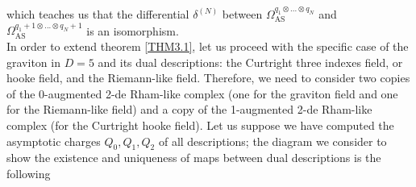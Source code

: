 \documentclass[a4paper,12pt]{article}
\begin{document}
which teaches us that the differential $\delta^{(N)}$ between $\Omega _{\text{AS}}^{q_{1} \otimes ...\otimes q_{N}}$ and $\Omega _{\text{AS}}^{q_{1}+1 \otimes ...\otimes q_{N}+1}$ is an isomorphism. \\
In order to extend theorem \ref{THM3.1}, let us proceed with the specific case of the graviton in $D=5$ and its dual descriptions: the Curtright three indexes field, or hooke field, and the Riemann-like field. Therefore, we need to consider two copies of the 0-augmented 2-de Rham-like complex (one for the graviton field and one for the Riemann-like field) and a copy of the 1-augmented 2-de Rham-like complex (for the Curtright hooke field). Let us suppose we have computed the asymptotic charges $Q_0,Q_1,Q_2$ of all descriptions; the diagram we consider to show the existence and uniqueness of maps between dual descriptions is the following
\end{document}
